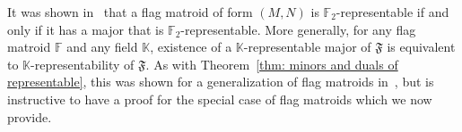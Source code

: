 \documentclass[12pt]{article}
\theoremstyle{definition}
\begin{document}


It was shown in~\cite[Lemma~2.1]{mundhe2019graphic} that a flag matroid of form $(M, N)$ is $\mathbb{F}_2$-representable if and only if it has a major that is $\mathbb{F}_2$-representable.
More generally, for any flag matroid $\mathbb{F}$ and any field $\mathbb{K}$, existence of a $\mathbb{K}$-representable major of $\mathfrak{F}$
is equivalent to $\mathbb{K}$-representability of $\mathfrak{F}$.
As with Theorem~\ref{thm: minors and duals of representable}, this was shown for a generalization of flag matroids in~\cite{jarra2024flag},
but is instructive to have a proof for the special case of flag matroids which we now provide.
\end{document}
